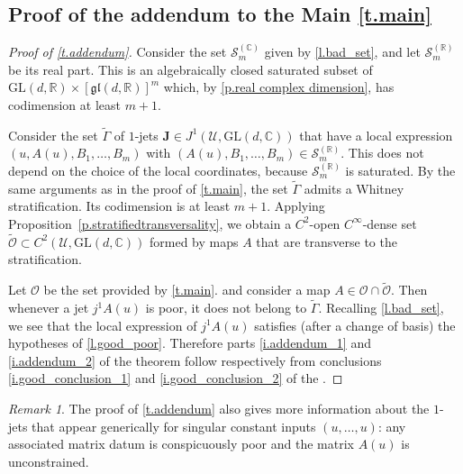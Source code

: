 \documentclass[10pt, a4paper]{amsart}
\theoremstyle{plain}
\theoremstyle{definition}
\theoremstyle{remark}
\theoremstyle{note}
\newtheorem{rem}[lemma]{Remark}
\numberwithin{equation}{section}
\begin{document}
\subsection{Proof of the addendum to the Main \cref{t.main}}

\begin{proof}[Proof of \cref{t.addendum}]
Consider the set ${\mathcal{S}}_m^{({\mathbb{C}})}$ given by \cref{l.bad_set},
and let ${\mathcal{S}}_m^{({\mathbb{R}})}$ be its real part.
This is an algebraically closed saturated subset of ${\mathrm{GL}}(d,{\mathbb{R}}) \times [{\mathfrak{gl}}(d,{\mathbb{R}})]^m$
which, by \cref{p.real complex dimension}, has codimension at least $m+1$.

Consider the set $\tilde \Gamma$ of $1$-jets ${\mathbf{J}} \in J^1({\mathcal{U}},{\mathrm{GL}}(d,{\mathbb{C}}))$ 
that have a local expression $(u, A(u),B_1,\dots,B_m)$
with $(A(u),B_1,\dots,B_m) \in {\mathcal{S}}_m^{({\mathbb{R}})}$.
This does not depend on the choice of the local coordinates, because ${\mathcal{S}}_m^{({\mathbb{R}})}$ is saturated.
By the same arguments as in the proof of \cref{t.main}, 
the set $\tilde \Gamma$ admits a Whitney stratification.
Its codimension is at least $m+1$.
Applying Proposition~\ref{p.stratifiedtransversality}, we obtain a $C^2$-open
$C^\infty$-dense set $\tilde {\mathcal{O}} \subset C^2({\mathcal{U}},{\mathrm{GL}}(d,{\mathbb{C}}))$ formed by maps $A$ 
that are transverse to the stratification.

Let ${\mathcal{O}}$ be the set provided by \cref{t.main}.
and consider a map $A \in {\mathcal{O}} \cap \tilde {\mathcal{O}}$.
Then whenever a jet $j^1 A (u)$ is poor,
it does not belong to $\tilde \Gamma$.
Recalling \cref{l.bad_set}, we see that the local expression of 
$j^1 A (u)$ satisfies (after a change of basis) the hypotheses of \cref{l.good_poor}.
Therefore parts \ref{i.addendum_1} and \ref{i.addendum_2} of the theorem
follow respectively from conclusions \ref{i.good_conclusion_1} and \ref{i.good_conclusion_2}
of the .
\end{proof}

\begin{rem}\label{r.addendum_of_addendum}
The proof of \cref{t.addendum} also gives more information
about the $1$-jets that appear generically for singular constant inputs $(u,\ldots,u)$:
any associated matrix datum is conspicuously poor 
and the matrix $A(u)$ is unconstrained. 
\end{rem}
\end{document}

